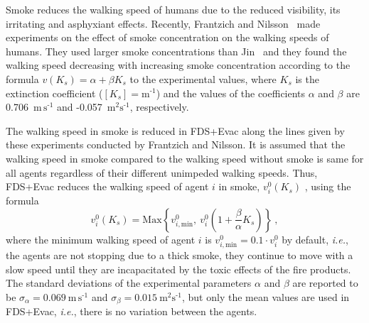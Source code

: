\documentclass[12pt,a4paper,final,twoside]{stylevk}
\begin{document}
Smoke reduces the walking speed of humans due to the reduced
visibility, its irritating and asphyxiant effects.  Recently,
Frantzich and Nilsson~\cite{Frantzich03} made experiments on the
effect of smoke concentration on the walking speeds of humans.  They
used larger smoke concentrations than Jin~\cite{Jin78} and they found
the walking speed decreasing with increasing smoke concentration
according to the formula $v (K_s) = \alpha + \beta K_s $ to the
experimental values, where $K_s$ is the extinction coefficient ($[K_s]
\!\! = \!\!  \mathrm{ \textrm{m}^\textrm{-1} } $) and the values of
the coefficients $\alpha$ and $\beta$ are 0.706~$\mathrm{ \textrm{m}
  \, \textrm{s}^\textrm{-1} } $ and -0.057~$\mathrm{
  \textrm{m}^\textrm{2} \textrm{s}^\textrm{-1} } $, respectively.


The walking speed in smoke is reduced in FDS+Evac along the lines
given by these experiments conducted by Frantzich and Nilsson.  It is
assumed that the walking speed in smoke compared to the walking speed
without smoke is same for all agents regardless of their different
unimpeded walking speeds.  Thus, FDS+Evac reduces the walking speed of
agent $i$ in smoke, $v^0_i (K_s)$ , using the formula
%
\begin{equation}\label{Eq_SpeedSmoke}
  v^0_i (K_s) = \mathrm{Max} \left \{ v^0_{i,\mathrm{min}} ,~
  v^0_i \left ( 1 + \frac{\beta}{\alpha} K_s \right ) \right \} ~,
\end{equation}
%
where the minimum walking speed of agent $i$ is $ v^0_{i,\mathrm{min}}
= 0.1 \cdot v^0_i$ by default, \emph{i.e.}, the agents are not
stopping due to a thick smoke, they continue to move with a slow speed
until they are incapacitated by the toxic effects of the fire
products.  The standard deviations of the experimental parameters
$\alpha$ and $\beta$ are reported to be $\sigma_\alpha =
0.069~\mathrm{ \textrm{m} \, \textrm{s}^\textrm{-1} } $ and
$\sigma_\beta = 0.015~ \mathrm{ \textrm{m}^\textrm{2}
  \textrm{s}^\textrm{-1} } $, but only the mean values are used in
FDS+Evac, \emph{i.e.}, there is no variation between the agents.

\end{document}
